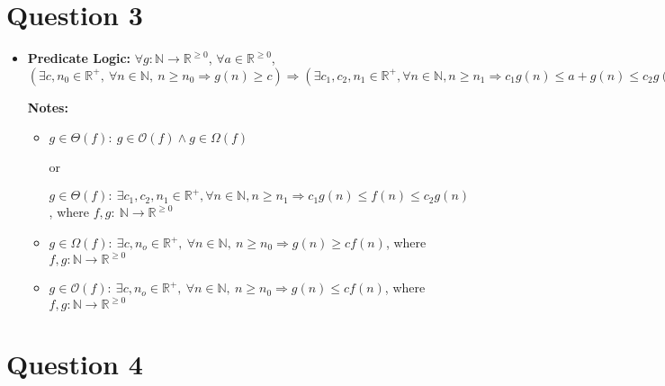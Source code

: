 \documentclass[12pt]{article}
\begin{document}
\section*{Question 3}
\begin{itemize}
    \item
    \textbf{Predicate Logic:} $\forall g:\mathbb{N} \to \mathbb{R}^{\geq 0}$,
    $\forall a \in \mathbb{R}^{\geq 0}$, $(\exists c,n_0 \in \mathbb{R}^{+},\:
    \forall n \in \mathbb{N},\:n \geq n_0 \Rightarrow g(n) \geq c) \Rightarrow
    (\exists c_1,c_2,n_1 \in \mathbb{R}^{+}, \forall n \in \mathbb{N}, n \geq n_1
    \Rightarrow c_1g(n) \leq  a + g(n) \leq c_2g(n))$

    \bigskip

    \textbf{Notes:}

    \begin{itemize}
        \item
        $g \in \Theta(f):\: g \in \mathcal{O}(f) \land g \in \Omega(f)$

        or

        $g \in \Theta(f):\:\exists c_1,c_2,n_1 \in \mathbb{R}^{+}, \forall n \in \mathbb{N}, n \geq n_1
        \Rightarrow c_1g(n) \leq f(n) \leq c_2g(n)$, where $f,g:\:\mathbb{N} \to \mathbb{R}^{\geq 0}$

        \item
        $g \in \Omega(f):\:\exists c,n_o \in \mathbb{R}^{+},\:\forall n \in
        \mathbb{N},\:n \geq n_0 \Rightarrow g(n) \geq cf(n)$, where $f,g:\mathbb{N} \to \mathbb{R}^{\geq 0}$

        \item

        $g \in \mathcal{O}(f):\:\exists c,n_o \in \mathbb{R}^{+},\:\forall n \in
        \mathbb{N},\:n \geq n_0 \Rightarrow g(n) \leq cf(n)$, where $f,g:\mathbb{N} \to \mathbb{R}^{\geq 0}$

    \end{itemize}
\end{itemize}

\section*{Question 4}
\end{document}
